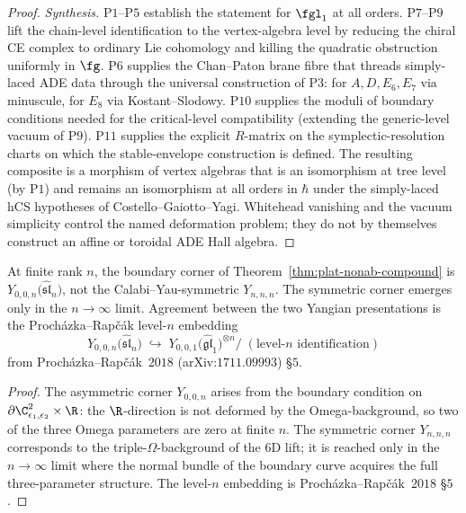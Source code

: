 \begin{proof}
\emph{Synthesis.}
P$1$--P$5$ establish the statement for $\fgl_1$ at all orders.
P$7$--P$9$ lift the chain-level identification to the vertex-algebra
level by reducing the chiral CE complex to ordinary Lie cohomology and
killing the quadratic obstruction uniformly in $\fg$.
P$6$ supplies the Chan--Paton brane fibre that threads simply-laced
ADE data through the universal construction of P$3$: for $A, D, E_6,
E_7$ via minuscule, for $E_8$ via Kostant--Slodowy.
P$10$ supplies the moduli of boundary conditions needed for the
critical-level compatibility (extending the generic-level vacuum of
P$9$).
P$11$ supplies the explicit \(R\)-matrix on the symplectic-resolution
charts on which the stable-envelope construction is defined.
The resulting composite is a morphism of vertex algebras that is an
isomorphism at tree level (by P$1$) and remains an isomorphism at all
orders in \(\hbar\) under the simply-laced hCS hypotheses of
Costello--Gaiotto--Yagi.  Whitehead vanishing and the vacuum simplicity
control the named deformation problem; they do not by themselves
construct an affine or toroidal ADE Hall algebra.
\end{proof}

\begin{corollary}
\label{cor:plat-corner}
At finite rank $n$, the boundary corner of
Theorem~\ref{thm:plat-nonab-compound} is
$Y_{0, 0, n}\!\bigl(\widehat{\mathfrak{sl}}_n\bigr)$, not the
Calabi--Yau-symmetric $Y_{n, n, n}$. The symmetric corner emerges only
in the $n \to \infty$ limit. Agreement between the two Yangian
presentations is the Proch\'azka--Rap\v{c}\'ak level-$n$ embedding
\[
 Y_{0,0,n}\!\bigl(\widehat{\mathfrak{sl}}_n\bigr)
 \;\hookrightarrow\;
 Y_{0,0,1}\!\bigl(\widehat{\mathfrak{gl}}_1\bigr)^{\otimes n}
 /\;(\text{level-}n\text{ identification})
\]
from Proch\'azka--Rap\v{c}\'ak~$2018$ (arXiv:$1711.09993$) \S$5$.
\end{corollary}

\begin{proof}
The asymmetric corner $Y_{0, 0, n}$ arises from the boundary
condition on $\partial \C^2_{\epsilon_1, \epsilon_2} \times \R$: the
$\R$-direction is not deformed by the Omega-background, so two of the
three Omega parameters are zero at finite $n$. The symmetric corner
$Y_{n,n,n}$ corresponds to the triple-$\Omega$-background of the $6$D
lift; it is reached only in the $n \to \infty$ limit where the
normal bundle of the boundary curve acquires the full three-parameter
structure. The level-$n$ embedding is Proch\'azka--Rap\v{c}\'ak~$2018$
\S$5$.
\end{proof}

